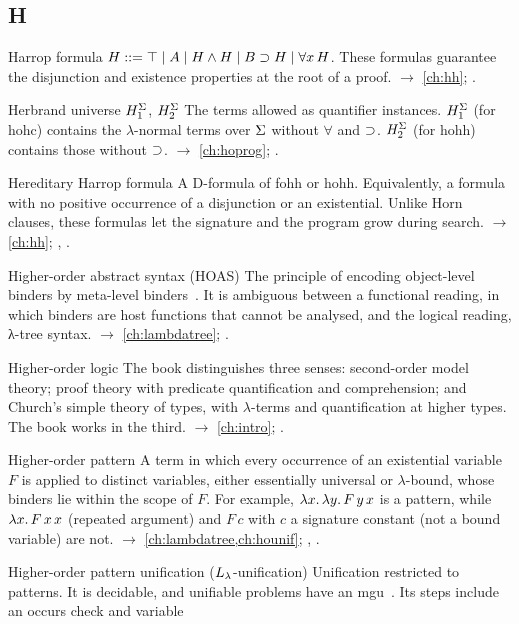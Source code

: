 \subsection*{H}
\begin{glossarylist}
\item[Harrop formula] $H ::= \top\mid A\mid H\wedge H\mid B\supset H\mid\forall x\,H$. These formulas guarantee the
  disjunction and existence properties at the root of a proof. $\rightarrow$ \cref{ch:hh}; .
\item[Herbrand universe $H_1^{\Sig}$, $H_2^{\Sig}$] The terms allowed as quantifier instances. $H_1^{\Sig}$ (for
  hohc) contains the $\lambda$-normal terms over $\Sigma$ without $\forall$ and $\supset$. $H_2^{\Sig}$ (for hohh)
  contains those without $\supset$. $\rightarrow$ \cref{ch:hoprog}; .
\item[Hereditary Harrop formula] A D-formula of fohh or hohh. Equivalently, a formula with no positive occurrence
  of a disjunction or an existential. Unlike Horn clauses, these formulas let the signature and the program grow
  during search. $\rightarrow$ \cref{ch:hh}; , .
\item[Higher-order abstract syntax (HOAS)] The principle of encoding object-level binders by meta-level
  binders~\cite{PfenningElliott1988}. It is ambiguous between a functional reading, in which binders are host
  functions that cannot be analysed, and the logical reading, λ-tree syntax. $\rightarrow$ \cref{ch:lambdatree};
  .
\item[Higher-order logic] The book distinguishes three senses: second-order model theory; proof theory with
  predicate quantification and comprehension; and Church's simple theory of types, with $\lambda$-terms and
  quantification at higher types. The book works in the third. $\rightarrow$ \cref{ch:intro}; .
\item[Higher-order pattern] A term in which every occurrence of an existential variable $F$ is applied to distinct
  variables, either essentially universal or $\lambda$-bound, whose binders lie within the scope of $F$. For
  example, $\lambda x.\,\lambda y.\,F\,y\,x$ is a pattern, while $\lambda x.\,F\,x\,x$ (repeated argument) and $F\,c$ with $c$
  a signature constant (not a bound variable) are not.
  $\rightarrow$ \cref{ch:lambdatree,ch:hounif}; , .
\item[Higher-order pattern unification ($\Llam$-unification)] Unification restricted to patterns. It is decidable,
  and unifiable problems have an mgu~\cite{Miller1991,Nipkow1993}. Its steps include an occurs check and variable

\end{glossarylist}
